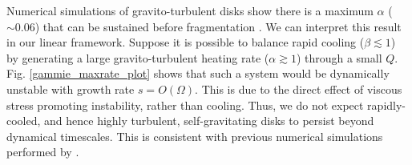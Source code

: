 Numerical simulations of gravito-turbulent disks show there is a
maximum $\alpha$ ($\sim 0.06$) that can be sustained before
fragmentation \citep{rice11}. We can interpret this result in our
linear framework. 
Suppose it is possible to balance rapid cooling ($\beta\lesssim1$) 
by generating a large gravito-turbulent heating rate
($\alpha\gtrsim 1$) through a small $Q$. Fig. \ref{gammie_maxrate_plot} 
shows that such a system would be dynamically unstable with 
growth rate $s = O(\Omega)$. This is due to the direct effect of viscous 
stress promoting instability, rather than cooling. Thus, we do not expect rapidly-cooled, 
and hence highly turbulent, self-gravitating disks to persist beyond
dynamical timescales. This is consistent with previous numerical
simulations performed by \cite{lodato05}. 
